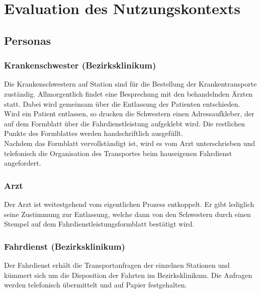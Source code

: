 \documentclass[a4paper, ngerman, 12pt]{scrartcl}
\begin{document}
\section{Evaluation des Nutzungskontexts}
\subsection{Personas}
\subsubsection{Krankenschwester (Bezirksklinikum)	}
Die Krankenschwestern auf Station sind für die Bestellung der Krankentransporte zuständig. Allmorgentlich findet eine Besprechung mit den behandelnden Ärzten statt. Dabei wird gemeinsam über die Entlassung der Patienten entschieden. Wird ein Patient entlassen, so drucken die Schwestern einen Adressaufkleber, der auf dem Formblatt über die Fahrdienstleistung aufgeklebt wird. Die restlichen Punkte des Formblattes werden handschriftlich ausgefüllt.\\
Nachdem das Formblatt vervollständigt ist, wird es vom Arzt unterschrieben und telefonisch die Organisation des Transportes beim hauseigenen Fahrdienst angefordert.
\subsubsection{Arzt}
Der Arzt ist weitestgehend vom eigentlichen Prozess entkoppelt. Er gibt lediglich seine Zustimmung zur Entlassung, welche dann von den Schwestern durch einen Stempel auf dem Fahrdienstleistungsformblatt bestätigt wird.
\subsubsection{Fahrdienst (Bezirksklinikum)}
Der Fahrdienst erhält die Transportanfragen der einzelnen Stationen und kümmert sich um die Disposition der Fahrten im Bezirksklinikum. Die Anfragen werden telefonisch übermittelt und auf Papier festgehalten.
\end{document}
